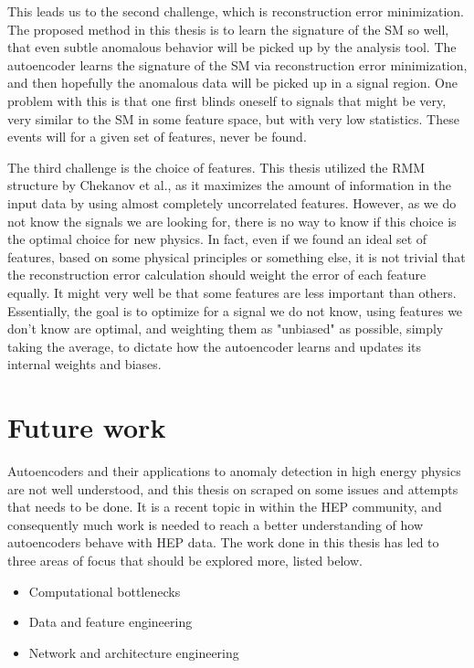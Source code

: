 This leads us to the second challenge, which is reconstruction error minimization. The proposed method in this thesis is to 
learn the signature of the SM so well, that even subtle anomalous behavior will be picked up by the analysis tool. 
The autoencoder learns the signature of the SM via reconstruction error minimization, and then hopefully the 
anomalous data will be picked up in a signal region. One problem with this is that one first blinds oneself to signals 
that might be very, very similar to the SM in some feature space, but with very low statistics. These events 
will for a given set of features, never be found. \par 

The third challenge is the choice of features. This thesis utilized the RMM structure by Chekanov et al., as it maximizes 
the amount of information in the input data by using almost completely uncorrelated features. However, as we do not know the signals 
we are looking for, there is no way to know if this choice is the optimal choice for new physics. In fact, even if we found 
an ideal set of features, based on some physical principles or something else, it is not trivial that the reconstruction error calculation
should weight the error of each feature equally. It might very well be that some features are less important than others. Essentially, 
the goal is to optimize for a signal we do not know, using features we don't know are optimal, and weighting them as "unbiased" as 
possible, simply taking the average, to dictate how the autoencoder learns and updates its internal weights and biases. 

\section{Future work}

Autoencoders and their applications to anomaly detection in high energy physics are not well understood, 
and this thesis on scraped on some issues and attempts that needs to be done. It is a recent topic in within 
the HEP community, and consequently much work is needed to reach a better understanding of how autoencoders 
behave with HEP data. The work done in this thesis has led to three areas of focus that should be explored more, 
listed below. 

\begin{itemize}
    \item Computational bottlenecks 
    \item Data and feature engineering 
    \item Network and architecture engineering
\end{itemize}

